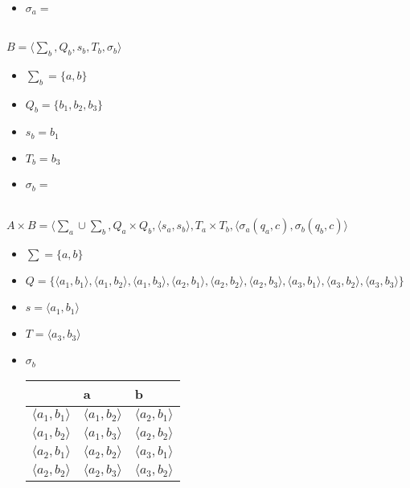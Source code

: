 \documentclass[10pt]{article}
\begin{document}
\begin{enumerate}
\begin{enumerate}[label*=\arabic*.]
\begin{itemize}
			\item $\sigma_a=$\\
			\\
		\end{itemize}
		$B=\langle \sum_b, Q_b, s_b, T_b, \sigma_b \rangle$\\
		\begin{itemize}
			\item $\sum_b=\{a,b\}$\\
			\item $Q_b=\{b_1,b_2,b_3\}$\\
			\item $s_b={b_1}$\\
			\item $T_b={b_3}$\\
			\item $\sigma_b=$\\
			\\
		\end{itemize}
		$A\times B=\langle \sum_a\cup\sum_b, Q_a\times Q_b, \langle s_a,s_b\rangle, T_a\times T_b, \langle\sigma_a(q_a,c),\sigma_b(q_b,c) \rangle$
		\begin{itemize}
			\item $\sum=\{a,b\}$\\
			\item $Q=\{\langle a_1,b_1\rangle,\langle a_1,b_2\rangle,\langle a_1,b_3\rangle,\langle a_2,b_1\rangle,\langle a_2,b_2\rangle,\langle a_2,b_3\rangle,\langle a_3,b_1\rangle,\langle a_3,b_2\rangle,\langle a_3,b_3\rangle\}$\\
			\item $s=\langle a_1,b_1\rangle$\\
			\item $T=\langle a_3,b_3\rangle$\\
			\item $\sigma_b$\\
			\begin{tabular}{ | l | l | l | }
				\hline
				 & a & b \\ \hline
				$\langle a_1,b_1\rangle$ & $\langle a_1,b_2\rangle$ & $\langle a_2,b_1\rangle$ \\
				$\langle a_1,b_2\rangle$ & $\langle a_1,b_3\rangle$ & $\langle a_2,b_2\rangle$ \\
				$\langle a_2,b_1\rangle$ & $\langle a_2,b_2\rangle$ & $\langle a_3,b_1\rangle$ \\
				$\langle a_2,b_2\rangle$ & $\langle a_2,b_3\rangle$ & $\langle a_3,b_2\rangle$ \\

\end{tabular}
\end{itemize}
\end{enumerate}
\end{enumerate}
\end{document}
